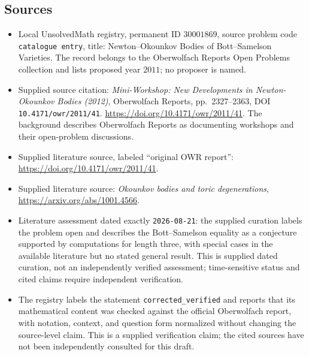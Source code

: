 \documentclass[11pt]{article}
\begin{document}
\subsection{Sources}
\begin{itemize}
\item Local UnsolvedMath registry, permanent ID \(30001869\), source problem code \texttt{catalogue entry}, title: Newton--Okounkov Bodies of Bott--Samelson Varieties. The record belongs to the Oberwolfach Reports Open Problems collection and lists proposed year \(2011\); no proposer is named.
\item Supplied source citation: \emph{Mini-Workshop: New Developments in Newton-Okounkov Bodies (2012)}, Oberwolfach Reports, pp.~2327--2363, DOI \texttt{10.4171/owr/2011/41}. \url{https://doi.org/10.4171/owr/2011/41}. The background describes Oberwolfach Reports as documenting workshops and their open-problem discussions.
\item Supplied literature source, labeled ``original OWR report'': \url{https://doi.org/10.4171/owr/2011/41}.
\item Supplied literature source: \emph{Okounkov bodies and toric degenerations}, \url{https://arxiv.org/abs/1001.4566}.
\item Literature assessment dated exactly \texttt{2026-08-21}: the supplied curation labels the problem open and describes the Bott--Samelson equality as a conjecture supported by computations for length three, with special cases in the available literature but no stated general result. This is supplied dated curation, not an independently verified assessment; time-sensitive status and cited claims require independent verification.
\item The registry labels the statement \texttt{corrected\_verified} and reports that its mathematical content was checked against the official Oberwolfach report, with notation, context, and question form normalized without changing the source-level claim. This is a supplied verification claim; the cited sources have not been independently consulted for this draft.
\end{itemize}
\end{document}
